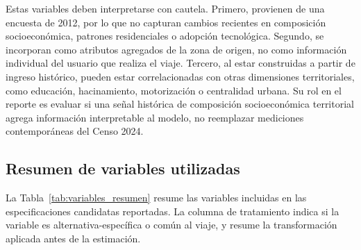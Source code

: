 Estas variables deben interpretarse con cautela. Primero, provienen de una encuesta de 2012, por lo que no capturan cambios recientes en composición socioeconómica, patrones residenciales o adopción tecnológica. Segundo, se incorporan como atributos agregados de la zona de origen, no como información individual del usuario que realiza el viaje. Tercero, al estar construidas a partir de ingreso histórico, pueden estar correlacionadas con otras dimensiones territoriales, como educación, hacinamiento, motorización o centralidad urbana. Su rol en el reporte es evaluar si una señal histórica de composición socioeconómica territorial agrega información interpretable al modelo, no reemplazar mediciones contemporáneas del Censo 2024.

\subsection{Resumen de variables utilizadas}

La Tabla~\ref{tab:variables_resumen} resume las variables incluidas en las especificaciones candidatas reportadas. La columna de tratamiento indica si la variable es alternativa-específica o común al viaje, y resume la transformación aplicada antes de la estimación.

